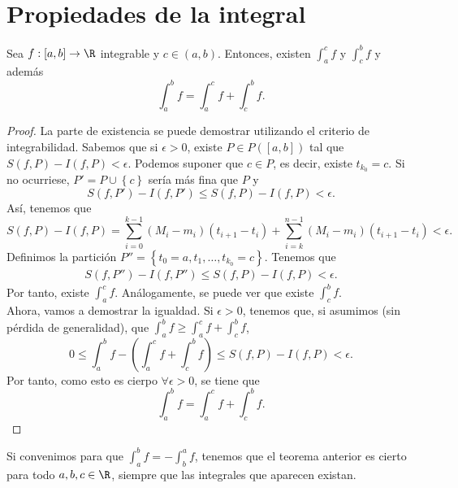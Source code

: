 \section{Propiedades de la integral}
\begin{ftheorem}[]
	\normalfont Sea $\displaystyle f : \left[a,b\right]  \to \R $ integrable y $\displaystyle c \in \left(a,b\right) $. Entonces, existen $\displaystyle \int^{c}_{a} f  $ y $\displaystyle \int^{b}_{c} f  $ y además
	\[ \int^{b}_{a} f = \int^{c}_{a} f + \int^{b}_{c} f .\]
\end{ftheorem}
\begin{proof}
	La parte de existencia se puede demostrar utilizando el criterio de integrabilidad. Sabemos que si $\displaystyle \epsilon > 0 $, existe $\displaystyle P \in P\left([a,b]\right) $ tal que $\displaystyle S\left(f,P\right)-I\left(f,P\right) < \epsilon  $. Podemos suponer que $\displaystyle c \in P $, es decir, existe $\displaystyle t_{k_{0}} =c $. Si no ocurriese, $\displaystyle P' = P \cup \left\{ c\right\}  $ sería más fina que $\displaystyle P $ y 
	\[ S\left(f,P'\right)-I\left(f,P'\right) \leq S\left(f,P\right)-I\left(f,P\right) < \epsilon  .\]
Así, tenemos que 
\[S\left(f,P\right)-I\left(f,P\right) = \sum^{k-1}_{i=0}\left(M_{i}-m_{i}\right)\left(t_{i+1}-t_{i}\right) + \sum^{n-1}_{i=k}\left(M_{i}-m_{i}\right)\left(t_{i+1}-t_{i}\right)<\epsilon  .\]
Definimos la partición $\displaystyle P''= \left\{ t_{0}= a, t_{1}, \ldots, t_{k_{0}}=c\right\}  $. Tenemos que 
\[
\begin{split}
S\left(f,P''\right)-I\left(f,P''\right) \leq S\left(f,P\right) - I\left(f,P\right) < \epsilon .
\end{split}
\]
Por tanto, existe $\displaystyle \int^{c}_{a} f $. Análogamente, se puede ver que existe $\displaystyle \int^{b}_{c} f $. \\ 
Ahora, vamos a demostrar la igualdad. Si $\displaystyle \epsilon > 0 $, tenemos que, si asumimos (sin pérdida de generalidad), que $\displaystyle \int^{b}_{a} f \geq \int^{c}_{a} f +\int^{b}_{c} f $,
\[ 0\leq \int^{b}_{a} f -\left(\int^{c}_{a} f +\int^{b}_{c} f \right) \leq S\left(f,P\right) - I\left(f,P\right) < \epsilon.\]
Por tanto, como esto es cierpo $\displaystyle \forall \epsilon > 0 $, se tiene que 
\[ \int^{b}_{a} f = \int^{c}_{a} f +\int^{b}_{c} f .\]
\end{proof}
\begin{observation}
\normalfont Si convenimos para que $\displaystyle \int^{b}_{a} f = - \int^{a}_{b} f $, tenemos que el teorema anterior es cierto para todo $\displaystyle a,b,c \in \R $, siempre que las integrales que aparecen existan.
\end{observation}
